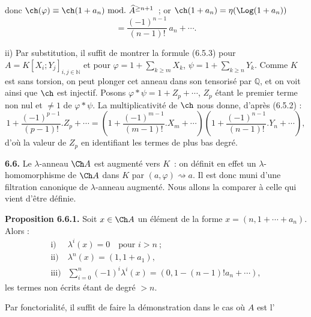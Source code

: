 donc \(\ch(\varphi)\equiv\ch(1+a_n)\ \mathrm{mod.}\ \widehat A^{\ge n+1}\)~; or \(\ch(1+a_n)=\eta(\Log(1+a_n))\)
\[
  =\frac{(-1)^{n-1}}{(n-1)!}\,a_n+\cdots .
\]

ii) Par substitution, il suffit de montrer la formule (6.5.3) pour \(A=K[X_i;Y_j]_{i,j\in\mathbb N}\) et pour \(\varphi=1+\sum_{k\ge m}X_k\), \(\psi=1+\sum_{k\ge n}Y_k\). Comme \(K\) est sans torsion, on peut plonger cet anneau dans son tensorisé par \(\mathbb Q\), et on voit ainsi que \(\ch\) est injectif. Posons \(\varphi*\psi=1+Z_p+\cdots\), \(Z_p\) étant le premier terme non nul et \(\neq1\) de \(\varphi*\psi\). La multiplicativité de \(\ch\) nous donne, d'après (6.5.2) :
\[
  1+\frac{(-1)^{p-1}}{(p-1)!}.Z_p+\cdots
  =
  \left(1+\frac{(-1)^{m-1}}{(m-1)!}.X_m+\cdots\right)
  \left(1+\frac{(-1)^{n-1}}{(n-1)!}.Y_n+\cdots\right),
\]
d'où la valeur de \(Z_p\) en identifiant les termes de plus bas degré.

\textbf{6.6.} Le \(\lambda\)-anneau \(\Ch A\) est augmenté vers \(K\)~: on définit en effet un \(\lambda\)-homomorphisme de \(\Ch A\) dans \(K\) par \((a,\varphi)\rightsquigarrow a\). Il est donc muni d'une filtration canonique de \(\lambda\)-anneau augmenté. Nous allons la comparer à celle qui vient d'être définie.

\textbf{Proposition 6.6.1.} Soit \(x\in\Ch A\) un élément de la forme \(x=(n,1+\cdots+a_n)\). Alors :
\[
\begin{array}{ll}
\text{i)}& \lambda^i(x)=0\quad\text{pour }i>n~;\\[0.3em]
\text{ii)}& \lambda^n(x)=(1,1+a_1),\\[0.3em]
\text{iii)}& \displaystyle\sum_{i=0}^n(-1)^i\lambda^i(x)
       =(0,1-(n-1)!a_n+\cdots),
\end{array}
\]
les termes non écrits étant de degré \(>n\).

Par fonctorialité, il suffit de faire la démonstration dans le cas où \(A\) est l'%
